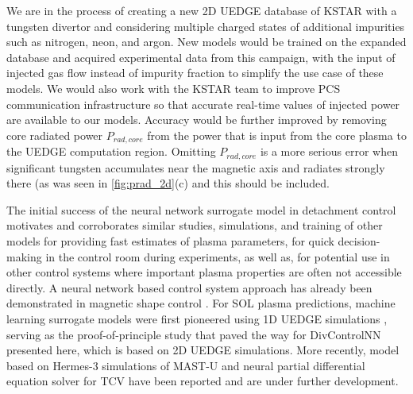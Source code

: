 \documentclass[10pt]{iopart}
\begin{document}
We are in the process of creating a new 2D UEDGE database of KSTAR with a tungsten divertor and considering multiple charged states of additional impurities such as nitrogen, neon, and argon.
New models would be trained on the expanded database and acquired experimental data from this campaign, with the input of injected gas flow instead of impurity fraction to simplify the use case of these models.
We would also work with the KSTAR team to improve PCS communication infrastructure so that accurate real-time values of injected power are available to our models.
Accuracy would be further improved by removing core radiated power $P_{rad,core}$ from the power that is input from the core plasma to the UEDGE computation region.
Omitting $P_{rad,core}$ is a more serious error when significant tungsten accumulates near the magnetic axis and radiates strongly there (as was seen in \ref{fig:prad_2d}(c) and this should be included.

The initial success of the neural network surrogate model in detachment control motivates and corroborates similar studies, simulations, and training of other models for providing fast estimates of plasma parameters, for quick decision-making in the control room during experiments, as well as, for potential use in other control systems where important plasma properties are often not accessible directly.
A neural network based control system approach has already been demonstrated in magnetic shape control \cite{Degrave_2022_Nature}.
For \ac{SOL} plasma predictions, machine learning surrogate models were first pioneered using 1D UEDGE simulations \cite{Zhu_2022_JPP}, serving as the proof-of-principle study that paved the way for DivControlNN presented here, which is based on 2D UEDGE simulations.
More recently, model based on Hermes-3 \cite{Dudson_2024_CPC} simulations of MAST-U \cite{Holt_2024_NF} and neural partial differential equation solver for TCV \cite{Poels_2023_NF} have been reported and are under further development.
\end{document}
